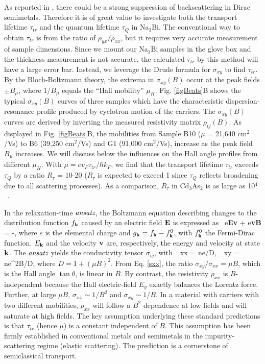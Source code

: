As reported in \cite{Liang2015}, there could be a strong suppression of backscattering in Dirac semimetals. Therefore it is of great value to investigate both the transport lifetime $\tau_{tr}$ and the quantum lifetime $\tau_Q$ in Na$_3$Bi. The conventional way to obtain $\tau_{tr}$ is from the ratio of $\rho_{yx}/\rho_{xx}$, but it requires very accurate measurement of sample dimensions. Since we mount our Na$_3$Bi samples in the glove box and the thickness measurement is not accurate, the calculated $\tau_{tr}$ by this method will have a large error bar. Instead, we leverage the Drude formula for $\sigma_{xy}$ to find $\tau_{tr}$. By the Bloch-Boltzmann theory, the extrema in $\sigma_{xy}(B)$ occur at the peak fields $\pm B_\mu$, where $1/B_\mu$ equals the ``Hall mobility'' $\mu_H$. Fig. \ref{figBeats}B shows the typical $\sigma_{xy}(B)$ curves of three samples which have the characteristic dispersion-resonance profile produced by cyclotron motion of the carriers. The $\sigma_{xy}(B)$ curves are derived by inverting the measured resistivity matrix $\rho_{ij}(B)$. As displayed in Fig. \ref{figBeats}B, the mobilities from Sample B10 ($\mu$ = 21,640 cm$^2$/Vs) to B6 (39,250 cm$^2$/Vs) and G1 (91,000 cm$^2$/Vs), increase as the peak field $B_{\mu}$ increases. We will discuss below the influences on the Hall angle profiles from different $\mu_H$. With $\mu = ev_F\tau_{tr}/\hbar k_F$, we find that the transport lifetime $\tau_{tr}$ exceeds $\tau_Q$ by a ratio $R_{\tau}$ = 10-20 ($R_{\tau}$ is expected to exceed 1 since $\tau_Q$ reflects broadening due to all scattering processes). As a comparison, $R_{\tau}$ in Cd$_3$As$_2$ is as large as 10$^4$~\cite{Liang2015}. 




In the relaxation-time $\emph{ansatz}$, the Boltzmann equation describing changes to the distribution function $f_{\bf k}$ caused by an electric field $\bf E$ is expressed as~\cite{Ziman}
\be
e{\bf E\cdot v}  
+ e{\bf v\times B\cdot}
= -,
\label{Boltz}
\ee
where $e$ is the elemental charge and $g_{\bf k} = f_{\bf k}-f^0_{\bf k}$, with $f^0_{\bf k}$ the Fermi-Dirac function. $E_{\bf k}$ and the velocity $\bf v$ are, respectively, the energy and velocity at state $\bf k$. The $\emph{ansatz}$ yields the conductivity tensor $\sigma_{ij}$, with 
\be
\sigma_{xx} = ne\mu/D, \quad\quad \sigma_{xy} = ne\mu^2B/D,
\label{sxx}
\ee
where $D = 1+(\mu B)^2$. From Eq. \ref{sxx}, the ratio $\sigma_{xy}/\sigma_{xx}= \mu B$, which is the Hall angle $\tan\theta$, is linear in $B$. By contrast, the resistivity $\rho_{xx}$ is $B$-independent because the Hall electric-field $E_y$ exactly balances the Lorentz force. Further, at large $\mu B$, $\sigma_{xx}\sim 1/B^2$ and $\sigma_{xy}\sim 1/B$. In a material with carriers with two different mobilities, $\rho_{xx}$ will follow a $B^2$ dependence at low fields and will saturate at high fields. The key assumption underlying these standard predictions is that $\tau_{tr}$ (hence $\mu$) is a constant independent of $B$. This assumption has been firmly established in conventional metals and semimetals in the impurity-scattering regime (elastic scattering). The prediction is a cornerstone of semiclassical transport.


